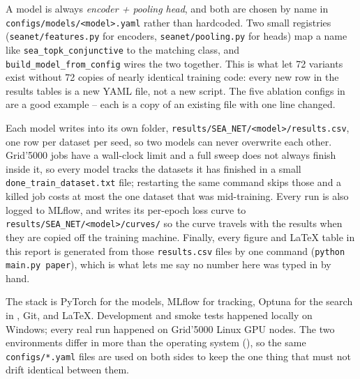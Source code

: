 A model is always \emph{encoder + pooling head}, and both are chosen by name in
\texttt{configs/models/<model>.yaml} rather than hardcoded. Two small registries
(\texttt{seanet/features.py} for encoders, \texttt{seanet/pooling.py} for heads) map a name like
\texttt{sea\_topk\_conjunctive} to the matching class, and \texttt{build\_model\_from\_config} wires
the two together. This is what let 72 variants exist without 72 copies of nearly identical training
code: every new row in the results tables is a new YAML file, not a new script. The five ablation
configs in  are a good example -- each is a copy of an existing file with one
line changed.

Each model writes into its own folder, \texttt{results/SEA\_NET/<model>/results.csv}, one row per
dataset per seed, so two models can never overwrite each other. Grid'5000 jobs have a wall-clock
limit and a full sweep does not always finish inside it, so every model tracks the datasets it has
finished in a small \texttt{done\_train\_dataset.txt} file; restarting the same command skips those
and a killed job costs at most the one dataset that was mid-training. Every run is also logged to
MLflow, and writes its per-epoch loss curve to \texttt{results/SEA\_NET/<model>/curves/} so the curve
travels with the results when they are copied off the training machine. Finally, every figure and
\LaTeX{} table in this report is generated from those \texttt{results.csv} files by one command
(\texttt{python main.py paper}), which is what lets me say no number here was typed in by hand.

The stack is PyTorch \citep{paszke2019pytorch} for the models, MLflow for tracking, Optuna
\citep{akiba2019optuna} for the search in , Git, and \LaTeX{}. Development and smoke
tests happened locally on Windows; every real run happened on Grid'5000 Linux GPU nodes. The two
environments differ in more than the operating system (), so the same
\texttt{configs/*.yaml} files are used on both sides to keep the one thing that must not drift
identical between them.
